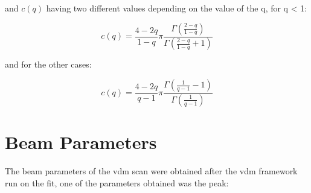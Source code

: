 and $c(q)$ having two different values depending on the value of the q, for q < 1: 

\begin{equation}
c(q) = \frac{4-2q}{1-q} \pi \frac{\Gamma (\frac{2-q}{1-q})}{\Gamma (\frac{2-q}{1-q} + 1)}
\end{equation}

and for the other cases:

\begin{equation}
c(q) = \frac{4-2q}{q-1} \pi \frac{\Gamma (\frac{1}{q-1} - 1)}{\Gamma (\frac{1}{q-1})}
\end{equation}




\section{Beam Parameters}

The beam parameters of the vdm scan were obtained after the vdm framework run on the fit, one of the parameters obtained was the peak: 



